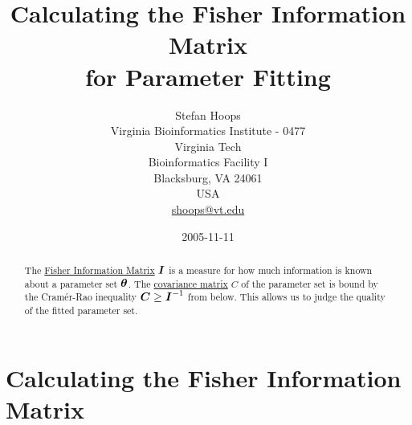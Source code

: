 \documentclass[12pt,english]{article}
\newcommand{\boldsymbol}[1]{\mbox{\boldmath $#1$}}
\begin{document}
\title{Calculating the Fisher Information Matrix \\
for Parameter Fitting}

\author{Stefan Hoops\\
 Virginia Bioinformatics Institute - 0477\\
 Virginia Tech\\
 Bioinformatics Facility I\\
 Blacksburg, VA 24061 \\
 USA \\
 \href{mailto:Stefan Hoops <shoops@vt.edu>}{shoops@vt.edu}}

\date{2005-11-11}

\maketitle
\begin{abstract}
The \href{http://planetmath.org/encyclopedia/FisherInformationMatrix.html}
{Fisher Information Matrix} $\boldsymbol{I}$ is a measure for how much
information is known about a parameter set $\boldsymbol{\theta}$.  The
\href{http://planetmath.org/encyclopedia/CovarianceMatrix.html}
{covariance matrix} $C$ of the parameter set is bound by the
Cram\'er-Rao inequality $\boldsymbol{C} \ge \boldsymbol{I}^{-1}$ from
below. This allows us to judge the quality of the fitted parameter
set.
\end{abstract}

\section{Calculating the Fisher Information Matrix}
\end{document}
